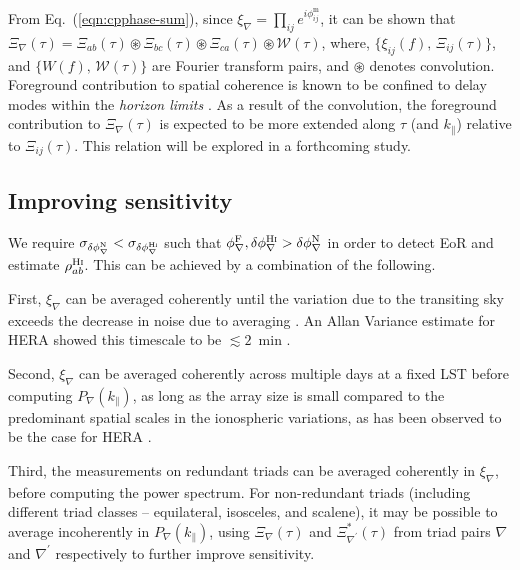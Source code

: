\documentclass[
reprint,
superscriptaddress,
amsmath,
amssymb,
aps,
prd
]{revtex4-1}
\begin{document}
From Eq.~(\ref{eqn:cpphase-sum}), since $\xi_\nabla = \prod_{ij} e^{i\phi_{ij}^\textrm{m}}$, it can be shown that $\Xi_\nabla(\tau) = \Xi_{ab}(\tau)\circledast \Xi_{bc}(\tau)\circledast \Xi_{ca}(\tau)\circledast \mathcal{W}(\tau)$, where, $\{\xi_{ij}(f),\,\Xi_{ij}(\tau)\}$, and $\{W(f),\,\mathcal{W}(\tau)\}$ are Fourier transform pairs, and $\circledast$ denotes convolution. Foreground contribution to spatial coherence is known to be confined to delay modes within the {\it horizon limits} \cite{bow09,liu09,liu14a,liu14b,dat10,liu11,gho12,mor12,par12b,tro12,ved12,dil13,pob13,thy13,thy15a,thy15b,thy16,dil14}. As a result of the convolution, the foreground contribution to $\Xi_\nabla(\tau)$ is expected to be more extended along $\tau$ (and $k_\parallel$) relative to $\Xi_{ij}(\tau)$. This relation will be explored in a forthcoming study. 

\subsection{Improving sensitivity}\label{sec:averaging}

We require $\sigma_{\delta\phi_\nabla^\textrm{N}} < \sigma_{\delta\phi_\nabla^\textrm{H{\sc i}}}$ such that $\phi_\nabla^\textrm{F}, \delta\phi_\nabla^\textrm{H{\sc i}} > \delta\phi_\nabla^\textrm{N}$ in order to detect EoR and estimate $\rho_{ab}^\textrm{H{\sc i}}$. This can be achieved by a combination of the following.

First, $\xi_\nabla$ can be averaged coherently until the variation due to the transiting sky exceeds the decrease in noise due to averaging \cite{car18}. An Allan Variance estimate for HERA showed this timescale to be $\lesssim 2$~min \cite{car18}.

Second, $\xi_\nabla$ can be averaged coherently across multiple days at a fixed LST before computing $P_\nabla(k_\parallel)$, as long as the array size is small compared to the predominant spatial scales in the ionospheric variations, as has been observed to be the case for HERA \cite{car18}. 

Third, the measurements on redundant triads can be averaged coherently in $\xi_\nabla$, before computing the power spectrum.  For non-redundant triads (including different triad classes -- equilateral, isosceles, and scalene), it may be possible to average incoherently in $P_\nabla(k_\parallel)$, using  $\Xi_\nabla(\tau)$ and $\Xi_{\nabla^\prime}^*(\tau)$ from triad pairs $\nabla$ and $\nabla^\prime$ respectively to further improve sensitivity. 
\end{document}
